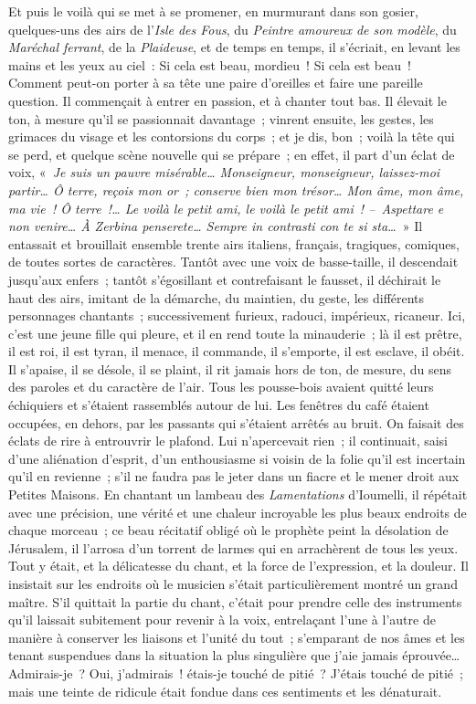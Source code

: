 \documentclass[french,twoside]{book} %
\begin{document}
Et puis le voilà qui se met à se promener, en murmurant dans son gosier, quelques-uns des airs de l’\emph{Isle des Fous}, du \emph{Peintre amoureux de son modèle}, du \emph{Maréchal ferrant}, de la \emph{Plaideuse}, et de temps en temps, il s’écriait, en levant les mains et les yeux au ciel : Si cela est beau, mordieu ! Si cela est beau ! Comment peut-on porter à sa tête une paire d’oreilles et faire une pareille question. Il commençait à entrer en passion, et à chanter tout bas. Il élevait le ton, à mesure qu’il se passionnait davantage ; vinrent ensuite, les gestes, les grimaces du visage et les contorsions du corps ; et je dis, bon ; voilà la tête qui se perd, et quelque scène nouvelle qui se prépare ; en effet, il part d’un éclat de voix, « \emph{Je suis un pauvre misérable… Monseigneur, monseigneur, laissez-moi partir… Ô terre, reçois mon or ; conserve bien mon trésor… Mon âme, mon âme, ma vie ! Ô terre !… Le voilà le petit ami, le voilà le petit ami ! – Aspettare e non venire… À Zerbina penserete… Sempre in contrasti con te si sta…} » Il entassait et brouillait ensemble trente airs italiens, français, tragiques, comiques, de toutes sortes de caractères. Tantôt avec une voix de basse-taille, il descendait jusqu’aux enfers ; tantôt s’égosillant et contrefaisant le fausset, il déchirait le haut des airs, imitant de la démarche, du maintien, du geste, les différents personnages chantants ; successivement furieux, radouci, impérieux, ricaneur. Ici, c’est une jeune fille qui pleure, et il en rend toute la minauderie ; là il est prêtre, il est roi, il est tyran, il menace, il commande, il s’emporte, il est esclave, il obéit. Il s’apaise, il se désole, il se plaint, il rit jamais hors de ton, de mesure, du sens des paroles et du caractère de l’air. Tous les pousse-bois avaient quitté leurs échiquiers et s’étaient rassemblés autour de lui. Les fenêtres du café étaient occupées, en dehors, par les passants qui s’étaient arrêtés au bruit. On faisait des éclats de rire à entrouvrir le plafond. Lui n’apercevait rien ; il continuait, saisi d’une aliénation d’esprit, d’un enthousiasme si voisin de la folie qu’il est incertain qu’il en revienne ; s’il ne faudra pas le jeter dans un fiacre et le mener droit aux Petites Maisons. En chantant un lambeau des \emph{Lamentations} d’Ioumelli, il répétait avec une précision, une vérité et une chaleur incroyable les plus beaux endroits de chaque morceau ; ce beau récitatif obligé où le prophète peint la désolation de Jérusalem, il l’arrosa d’un torrent de larmes qui en arrachèrent de tous les yeux. Tout y était, et la délicatesse du chant, et la force de l’expression, et la douleur. Il insistait sur les endroits où le musicien s’était particulièrement montré un grand maître. S’il quittait la partie du chant, c’était pour prendre celle des instruments qu’il laissait subitement pour revenir à la voix, entrelaçant l’une à l’autre de manière à conserver les liaisons et l’unité du tout ; s’emparant de nos âmes et les tenant suspendues dans la situation la plus singulière que j’aie jamais éprouvée… Admirais-je ? Oui, j’admirais ! étais-je touché de pitié ? J’étais touché de pitié ; mais une teinte de ridicule était fondue dans ces sentiments et les dénaturait.\par
\end{document}
